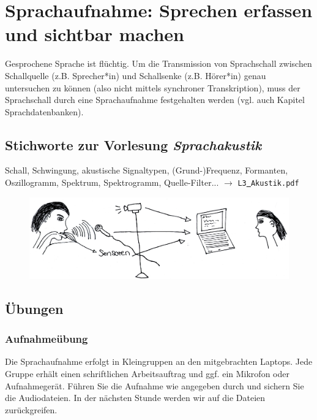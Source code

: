 \chapter{Sprachaufnahme: Sprechen erfassen und sichtbar machen} 

Gesprochene Sprache ist flüchtig. Um die Transmission von Sprachschall zwischen Schallquelle (z.\thinspace B. Sprecher*in) und Schallsenke (z.\thinspace B. Hörer*in) genau untersuchen zu können (also nicht mittels synchroner Transkription), muss der Sprachschall durch eine Sprachaufnahme festgehalten werden (vgl. auch Kapitel Sprachdatenbanken). 

\section{Stichworte zur Vorlesung \em{Sprachakustik}}

Schall, Schwingung, akustische Signaltypen, (Grund-)Frequenz, Formanten, Oszillogramm, Spektrum, Spektrogramm, Quelle-Filter... $\rightarrow$ {\tt L3\underline{\ }Akustik.pdf}
\begin{figure}[htbp]
\begin{center}
\includegraphics[width=\textwidth]{grafiken/sprachaufnahme/sprechen-erfassen.jpg}
\label{t2}
\end{center}
\end{figure}

\section{Übungen}

\subsection*{Aufnahmeübung}


Die Sprachaufnahme erfolgt in Kleingruppen an den mitgebrachten Laptops. Jede Gruppe erhält einen schriftlichen Arbeitsauftrag und ggf. ein Mikrofon oder Aufnahmegerät. Führen Sie die Aufnahme wie angegeben durch und sichern Sie die Audiodateien. In der nächsten Stunde werden wir auf die Dateien zurückgreifen.
\vspace*{7cm} 


